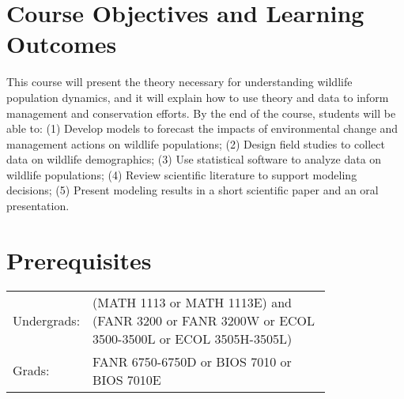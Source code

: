 \documentclass[12pt]{article}
\begin{document}
\vspace{-3mm}
\section*{\normalsize Course Objectives and Learning Outcomes}
\vspace{-4mm}
This course will present the theory necessary for understanding
wildlife population dynamics, and it will explain how to use theory
and data to inform management and conservation efforts. By the end of 
the course, students will be able to: (1) Develop models to forecast
the impacts of environmental change and management actions on wildlife
populations; (2) Design field studies to collect data on wildlife
demographics; (3) Use statistical software to analyze data on wildlife
populations; (4) Review scientific literature to support modeling
decisions; (5) Present modeling results in a short scientific paper
and an oral presentation. 


\vspace{-3mm}
\section*{\normalsize Prerequisites}
\vspace{-4mm}

\begin{tabular}{lp{0.8\linewidth}}
  Undergrads:& (MATH 1113 or MATH 1113E) and (FANR 3200 or FANR 3200W or
  ECOL 3500-3500L or ECOL 3505H-3505L) \\
  Grads:& FANR 6750-6750D or BIOS 7010 or BIOS 7010E \\
\end{tabular}
\end{document}
